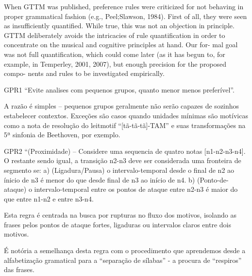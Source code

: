\documentclass[
	12pt,				%
	openright,			%
	twoside,			%
	a4paper,			%
	english,			%
	french,				%
	spanish,			%
	brazil				%
	]{abntex2}
\begin{document}
\begin{citacao}
When GTTM was published, preference rules were
criticized for not behaving in proper grammatical fashion (e.g., Peel;Slawson, 1984). First of all, they were
seen as insufficiently quantified. While true, this was not
an objection in principle. GTTM deliberately avoids the
intricacies of rule quantification in order to concentrate
on the musical and cognitive principles at hand. Our for-
mal goal was not full quantification, which could come
later (as it has begun to, for example, in Temperley, 2001,
2007), but enough precision for the proposed compo-
nents and rules to be investigated empirically.
\end{citacao}
\cite{lerdahl2009genesis}











\begin{citacao}
GPR1 “Evite analises com pequenos grupos, quanto menor menos preferível”.
\cite[ p.43]{lerdahl1983generative}
\end{citacao}


A razão é simples – pequenos grupos geralmente não serão capazes de sozinhos estabelecer contextos. Exceções são casos quando unidades mínimas são motívicas como a nota de resolução do leitmotif “[tã-tã-tã]-TAM” e suas transformações na 5ª sinfonia de Beethoven, por exemplo.

\begin{citacao}
GPR2 “(Proximidade) – Considere uma sequencia de quatro notas [n1-n2-n3-n4].\linebreak
O restante sendo igual, a transição n2-n3 deve ser considerada uma fronteira de segmento se:\linebreak
a) (Ligadura/Pausa) o intervalo-temporal desde o final de n2 ao ínicio de n3 é menor do que desde final de n3 ao início de n4.\linebreak
b) (Ponto-de-ataque) o intervalo-temporal entre os pontos de ataque entre n2-n3 é maior do que entre n1-n2  e entre n3-n4.
\cite[ p.45]{lerdahl1983generative}
\end{citacao}

Esta regra é centrada na busca por rupturas no fluxo dos motivos, isolando as frases pelos pontos de ataque fortes, ligaduras ou intervalos claros entre dois motivos.  


É notória a semelhança desta regra com o procedimento que aprendemos desde a alfabetização gramatical para a “separação de sílabas” - a procura de “respiros” das frases. 
\end{document}
